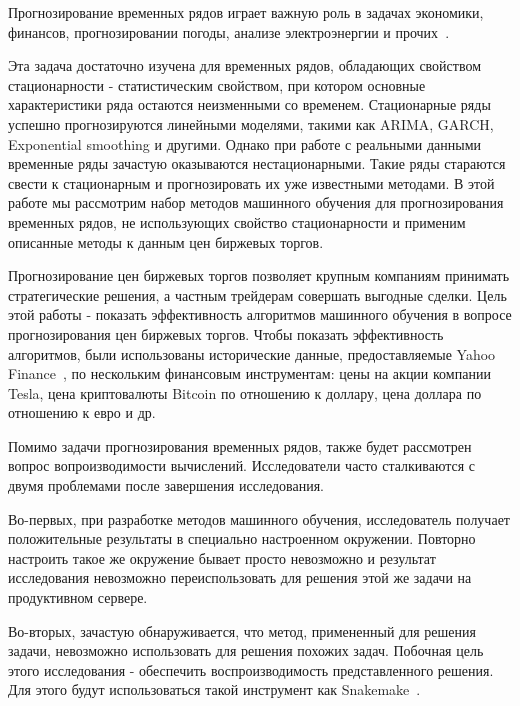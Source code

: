 \documentclass[a4paper,article,14pt]{extarticle}
\begin{document}


\tableofcontents

\pagebreak
{}

Прогнозирование временных рядов играет важную роль в задачах экономики, финансов, прогнозировании погоды, анализе электроэнергии и прочих~\cite{ts25}.

Эта задача достаточно изучена для временных рядов, обладающих свойством стационарности - статистическим свойством, при котором основные характеристики ряда остаются неизменными со временем.
Стационарные ряды успешно прогнозируются линейными моделями, такими как ARIMA, GARCH, Exponential smoothing и другими.
Однако при работе с реальными данными временные ряды зачастую оказываются нестационарными.
Такие ряды стараются свести к стационарным и прогнозировать их уже известными методами.
В этой работе мы рассмотрим набор методов машинного обучения для прогнозирования временных рядов, не использующих свойство стационарности и применим описанные методы к данным цен биржевых торгов.
\par

Прогнозирование цен биржевых торгов позволяет крупным компаниям принимать стратегические решения, а частным трейдерам совершать выгодные сделки.
Цель этой работы - показать эффективность алгоритмов машинного обучения в вопросе прогнозирования цен биржевых торгов.
Чтобы показать эффективность алгоритмов, были использованы исторические данные, предоставляемые Yahoo Finance~\cite{yahoo},
по нескольким финансовым инструментам: цены на акции компании Tesla,
цена криптовалюты Bitcoin по отношению к доллару, цена доллара по отношению к евро и др.
\par

Помимо задачи прогнозирования временных рядов, также будет рассмотрен вопрос вопроизводимости вычислений.
Исследователи часто сталкиваются с двумя проблемами после завершения исследования.
\par
Во-первых, при разработке методов машинного обучения, исследователь получает положительные результаты в специально настроенном окружении.
Повторно настроить такое же окружение бывает просто невозможно и результат исследования невозможно переиспользовать для решения этой же задачи на продуктивном сервере.
\par
Во-вторых, зачастую обнаруживается, что метод, примененный для решения задачи, невозможно использовать для решения похожих задач.
Побочная цель этого исследования - обеспечить воспроизводимость представленного решения.
Для этого будут использоваться такой инструмент как Snakemake~\cite{snakemake}.
\end{document}
